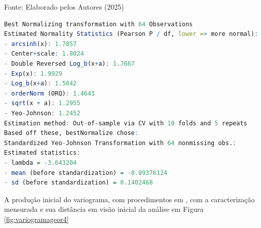  			\begin{center}
 				Fonte:   Elaborado pelos Autores (2025)
 			\end{center}
 \lstset{
	language=R, %
	caption= Sujestões de melhoria ao modelo em  linguagem R} %
\begin{lstlisting}[language=R]
 Best Normalizing transformation with 64 Observations
Estimated Normality Statistics (Pearson P / df, lower => more normal):
- arcsinh(x): 1.7857
- Center+scale: 1.8024
- Double Reversed Log_b(x+a): 1.7667
- Exp(x): 1.9929
- Log_b(x+a): 1.5042
- orderNorm (ORQ): 1.4643
- sqrt(x + a): 1.2955
- Yeo-Johnson: 1.2452
Estimation method: Out-of-sample via CV with 10 folds and 5 repeats 
Based off these, bestNormalize chose:
Standardized Yeo-Johnson Transformation with 64 nonmissing obs.:
Estimated statistics:
- lambda = -3.643204 
- mean (before standardization) = -0.09376124 
- sd (before standardization) = 0.1402468
\end{lstlisting}  
% 
\hspace*{1.25 cm} A produção inicial do variograma,  com procedimentos em \cite[p.224]{Bivand}, com a caracterização mensurada e sua distância em visão inicial da análise em Figura \ref{fig:variogramageor4}\\
 
